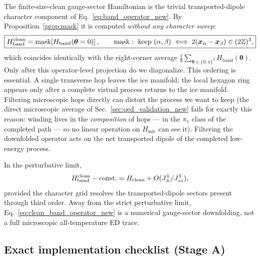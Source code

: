 \documentclass[11pt,letterpaper]{article}
\newcommand{\Jzz}{J_{zz}}
\newcommand{\Jpm}{J_{\pm}}
\newcommand{\Hclean}{H_{\mathrm{clean}}}
\newcommand{\btheta}{\bm \theta}
\newcommand{\Z}{\mathbb Z}
\newcommand{\HB}{H_{\mathrm{band}}}
\newcommand{\Hmic}{H_{\mathrm{mic}}}
\theoremstyle{plain}
\theoremstyle{definition}
\begin{document}
The finite-size-clean gauge-sector Hamiltonian is the trivial
transported-dipole character component of Eq.~\eqref{eq:band_operator_new}.
By Proposition~\ref{prop:mask} it is computed \emph{without any character
sweep}:
\begin{equation}
\boxed{
\HB^{\rm clean}
=\mathrm{mask}\!\left[\HB(\btheta=0)\right],
\qquad
\mathrm{mask}:\ \text{keep }(\alpha,\beta)\iff
2(\bm x_\alpha-\bm x_\beta)\in(2\Z)^3,
}
\label{eq:clean_band_operator_new}
\end{equation}
which coincides identically with the eight-corner average
$\frac18\sum_{\btheta\in\{0,\pi\}^3}\HB(\btheta)$.
Only after this operator-level projection do we diagonalize.  This ordering
is essential.  A single transverse hop leaves the ice manifold; the local
hexagon ring appears only after a complete virtual process returns to the ice
manifold.  Filtering microscopic hops directly can distort the process we
want to keep (the direct microscopic average of
Sec.~\ref{sec:qed_validation_new} fails for exactly this reason: winding
lives in the \emph{composition} of hops --- in the $\pi_1$ class of the
completed path --- so no linear operation on $\Hmic$ can see it).  Filtering
the downfolded operator acts on the net transported dipole of the completed
low-energy process.

In the perturbative limit,
\begin{equation}
\HB^{\rm clean}-\mathrm{const.}
=\Hclean+O(\Jpm^4/\Jzz^3),
\label{eq:qed_to_sw_limit_new}
\end{equation}
provided the character grid resolves the transported-dipole sectors present
through third order.  Away from the strict perturbative limit,
Eq.~\eqref{eq:clean_band_operator_new} is a numerical gauge-sector downfolding,
not a full microscopic all-temperature ED trace.

\subsection{Exact implementation checklist (Stage A)}
\end{document}
